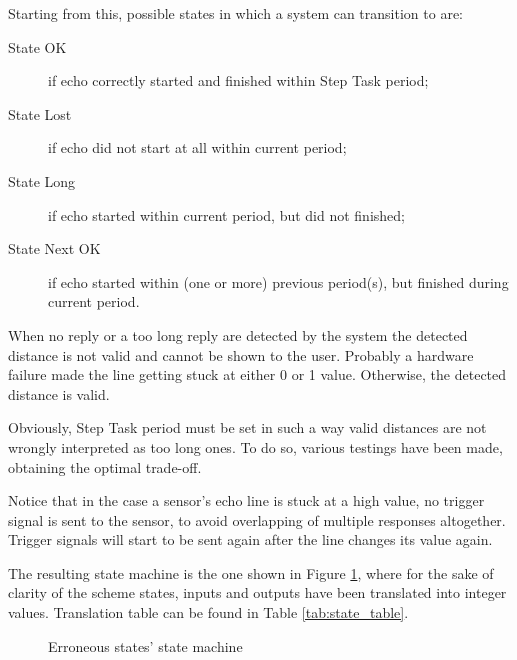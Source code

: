 Starting from this, possible states in which a system can transition to are:
\begin{description}
    \item[State OK] if echo correctly started and finished within Step Task period;
    \item[State Lost] if echo did not start at all within current period;
    \item[State Long] if echo started within current period, but did not finished;
    \item[State Next OK] if echo started within (one or more) previous period(s), but finished during current period.
\end{description}

When no reply or a too long reply are detected by the system the detected distance is not valid and cannot be shown to the user. Probably a hardware failure made the line getting stuck at either 0 or 1 value. Otherwise, the detected distance is valid.

Obviously, Step Task period must be set in such a way valid distances are not wrongly interpreted as too long ones. To do so, various testings have been made, obtaining the optimal trade-off.

Notice that in the case a sensor's echo line is stuck at a high value, no trigger signal is sent to the sensor, to avoid overlapping of multiple responses altogether. Trigger signals will start to be sent again after the line changes its value again.

The resulting state machine is the one shown in Figure \ref{fig:state_machine}, where for the sake of clarity of the scheme states, inputs and outputs have been translated into integer values. Translation table can be found in Table \ref{tab:state_table}.

\begin{figure}[tp]
\centering
    
\caption{Erroneous states' state machine}
\label{fig:state_machine}
\end{figure}

